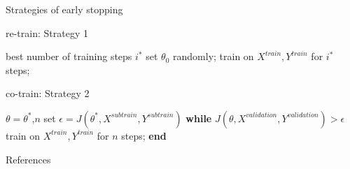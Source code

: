 \documentclass[xcolor=dvipsnames]{beamer}
\begin{document}
\begin{frame}{Strategies of early stopping }

  \begin{algorithm}[H]
    \caption*{re-train: Strategy 1}
    \begin{algorithmic}
      \Require best number of training steps $i^*$
      \State set $\theta_0$ randomly;
      \State train on $X^{train},Y^{train}$ for $i^*$ steps;
    \end{algorithmic}
  \end{algorithm}
  \pause
  \begin{algorithm}[H]
    \caption*{co-train: Strategy 2}
    \begin{algorithmic}
      \Require $\theta=\theta^*$,$n$
      \State set $\epsilon=J(\theta^*,X^{subtrain},Y^{subtrain})$
      \State \textbf{while} $J(\theta,X^{validation},Y^{validation})>\epsilon$
      \State \text{\ \ }train on $X^{train},Y^{train}$ for $n$ steps;
      \State \textbf{end}
    \end{algorithmic}
  \end{algorithm}

\end{frame}

\begin{frame}[allowframebreaks]{References}

  

\end{frame}

\end{document}
